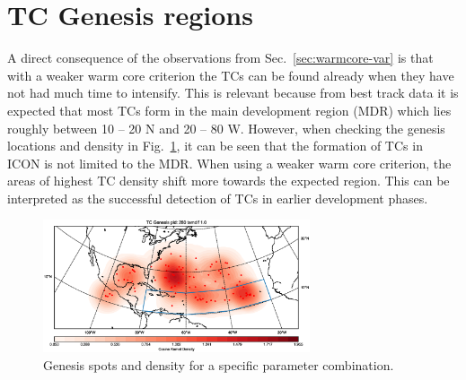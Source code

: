 \section{TC Genesis regions}
A direct consequence of the observations from Sec.~\ref{sec:warmcore-var} is that with a weaker warm core criterion the TCs can be found already when they have not had much time to intensify. This is relevant because from best track data it is expected that most TCs form in the main development region (MDR) which lies roughly between 10 -- 20 \degree N and 20 -- 80 \degree W. However, when checking the genesis locations and density in Fig.~\ref{fig:genesis-temdif1}, it can be seen that the formation of TCs in ICON is not limited to the MDR. When using a weaker warm core criterion, the areas of highest TC density shift more towards the expected region. This can be interpreted as the successful detection of TCs in earlier development phases. 
\begin{figure}[ht]
	\centering
	\includegraphics[width=0.7\textwidth]{img/genesis_plot_temdif1.eps}
	\caption{Genesis spots and density for a specific parameter combination.}
	\label{fig:genesis-temdif1}
\end{figure}




